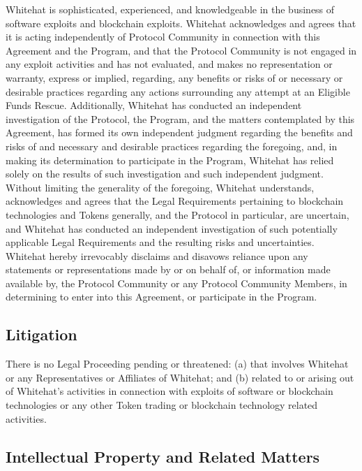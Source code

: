 \documentclass{article}
\begin{document}
Whitehat is sophisticated, experienced, and knowledgeable in the business of software exploits and blockchain exploits. Whitehat acknowledges and agrees that it is acting independently of Protocol Community in connection with this Agreement and the Program, and that the Protocol Community is not engaged in any exploit activities and has not evaluated, and makes no representation or warranty, express or implied, regarding, any benefits or risks of or necessary or desirable practices regarding any actions surrounding any attempt at an Eligible Funds Rescue. Additionally, Whitehat has conducted an independent investigation of the Protocol, the Program, and the matters contemplated by this Agreement, has formed its own independent judgment regarding the benefits and risks of and necessary and desirable practices regarding the foregoing, and, in making its determination to participate in the Program, Whitehat has relied solely on the results of such investigation and such independent judgment. Without limiting the generality of the foregoing, Whitehat understands, acknowledges and agrees that the Legal Requirements pertaining to blockchain technologies and Tokens generally, and the Protocol in particular, are uncertain, and Whitehat has conducted an independent investigation of such potentially applicable Legal Requirements and the resulting risks and uncertainties. Whitehat hereby irrevocably disclaims and disavows reliance upon any statements or representations made by or on behalf of, or information made available by, the Protocol Community or any Protocol Community Members, in determining to enter into this Agreement, or participate in the Program.

\subsection{Litigation}\label{subsec:litigation}

There is no Legal Proceeding pending or threatened: (a) that involves Whitehat or any Representatives or Affiliates of Whitehat; and (b) related to or arising out of Whitehat's activities in connection with exploits of software or blockchain technologies or any other Token trading or blockchain technology related activities.

\subsection{Intellectual Property and Related Matters}\label{subsec:ip}
\end{document}
